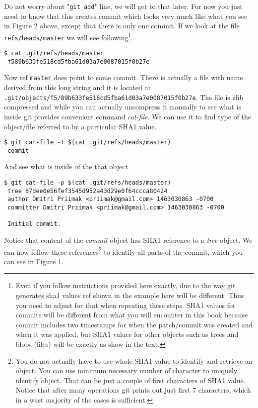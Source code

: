 \documentclass{article}
\theoremstyle{definition}
\begin{document}
        Do not worry about "\texttt{git add}" line, we will get to that later. For now you just need to know that this
        creates commit which looks very much like what you see in Figure 2 above, except that there is only one commit. If
        we look at the file \texttt{refs/heads/master} we will see following\footnote{Even if you follow instructions
        provided here exactly, due to the way git generates sha1 values ref shown in the example here will be different.
        Thus you need to adjust for that when repeating these steps. SHA1 values for commits will be different from what
        you will encounter in this book because commit includes two timestamps for when the patch/commit was created and
        when it was applied, but SHA1 values for other objects such as trees and blobs (files) will be exactly as show
        in the text.}

        \begin{Verbatim}[frame=single]
 $ cat .git/refs/heads/master
 f589b633fe518cd5fba61d03a7e0087015f0b27e
        \end{Verbatim}

        Now ref \texttt{master} does point to some commit. There is actually a file with name derived from this long
        string and it is located at \texttt{.git/objects/f5/89b633fe518cd5fba61d03a7e0087015f0b27e}. The file is zlib
        compressed and while you can actually uncompress it manually to see what is inside git provides convenient
        command {\em cat-file}. We can use it to find type of the object/file referred to by a particular SHA1 value.

        \begin{Verbatim}[frame=single]
 $ git cat-file -t $(cat .git/refs/heads/master)
 commit
        \end{Verbatim}
        And see what is inside of the that object

        \begin{Verbatim}[frame=single]
 $ git cat-file -p $(cat .git/refs/heads/master)
 tree 87dee0e56fef3545d952a43d29e0f64ccca80424
 author Dmitri Priimak <priimak@gmail.com> 1463030863 -0700
 committer Dmitri Priimak <priimak@gmail.com> 1463030863 -0700

 Initial commit.
        \end{Verbatim}
        Notice that content of the {\em commit} object has SHA1 reference to a {\em tree} object. We can now follow these
        references\footnote{You do not actually have to use whole SHA1 value to identify and retrieve an object. You can use
        minimum necessary number of character to uniquely identify object. That can be just a couple of first characters
        of SHA1 value. Notice that after many operations git prints out just first 7 characters, which in a wast majority of
        the cases is sufficient.} to identify all parts of the commit, which you can see in Figure 1.
\end{document}
